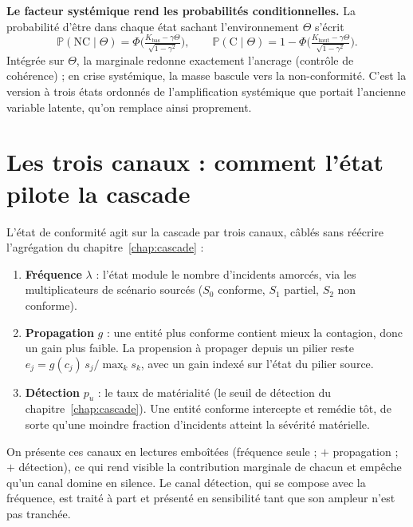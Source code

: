 \begin{cle}
\textbf{Le facteur systémique rend les probabilités conditionnelles.} La probabilité d'être dans
chaque état sachant l'environnement $\Theta$ s'écrit
\begin{equation}
\mathbb P(\text{NC}\mid\Theta)=\Phi\!\Big(\tfrac{K_{\text{bas}}-\gamma\Theta}{\sqrt{1-\gamma^2}}\Big),
\qquad
\mathbb P(\text{C}\mid\Theta)=1-\Phi\!\Big(\tfrac{K_{\text{haut}}-\gamma\Theta}{\sqrt{1-\gamma^2}}\Big).
\end{equation}
Intégrée sur $\Theta$, la marginale redonne exactement l'ancrage (contrôle de cohérence) ; en
crise systémique, la masse bascule vers la non-conformité. C'est la version à trois états
ordonnés de l'amplification systémique que portait l'ancienne variable latente, qu'on remplace
ainsi proprement.
\end{cle}



\section{Les trois canaux : comment l'état pilote la cascade}

L'état de conformité agit sur la cascade par trois canaux, câblés sans réécrire
l'agrégation du chapitre~\ref{chap:cascade} :
\begin{enumerate}[leftmargin=1.5em,itemsep=2pt,topsep=2pt]
\item \textbf{Fréquence} $\lambda$ : l'état module le nombre d'incidents amorcés, via les
  multiplicateurs de scénario sourcés ($S_0$ conforme, $S_1$ partiel, $S_2$ non conforme).
\item \textbf{Propagation} $g$ : une entité plus conforme contient mieux la contagion, donc un
  gain plus faible. La propension à propager depuis un pilier reste $e_j=g(c_j)\,s_j/\max_k s_k$,
  avec un gain indexé sur l'état du pilier source.
\item \textbf{Détection} $p_u$ : le taux de matérialité (le seuil de détection du
  chapitre~\ref{chap:cascade}). Une entité conforme intercepte et remédie tôt, de sorte qu'une
  moindre fraction d'incidents atteint la sévérité matérielle.
\end{enumerate}
On présente ces canaux en lectures emboîtées (fréquence seule ; $+$ propagation ; $+$
détection), ce qui rend visible la contribution marginale de chacun et empêche qu'un canal
domine en silence. Le canal détection, qui se compose avec la fréquence, est traité à part et
présenté en sensibilité tant que son ampleur n'est pas tranchée.

